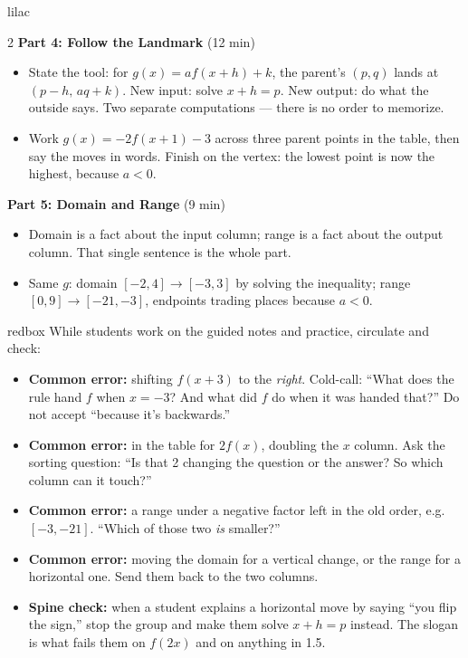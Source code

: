 \documentclass[10pt]{article}
\begin{document}
\begin{skillbox}[Lesson]{lilac}
\begin{multicols}{2}
\textbf{Part 4: Follow the Landmark} (12 min)

\begin{itemize}
  \item State the tool: for $g(x)=af(x+h)+k$, the parent's $(p,q)$ lands at
        $(p-h,\,aq+k)$. New input: solve $x+h=p$. New output: do what the
        outside says. Two separate computations --- there is no order to
        memorize.
  \item Work $g(x)=-2f(x+1)-3$ across three parent points in the table, then
        say the moves in words. Finish on the vertex: the lowest point is now
        the highest, because $a<0$.
\end{itemize}

\textbf{Part 5: Domain and Range} (9 min)

\begin{itemize}
  \item Domain is a fact about the input column; range is a fact about the
        output column. That single sentence is the whole part.
  \item Same $g$: domain $[-2,4] \to [-3,3]$ by solving the inequality; range
        $[0,9] \to [-21,-3]$, endpoints trading places because $a<0$.
\end{itemize}
\end{multicols}
\end{skillbox}

\begin{skillbox}{redbox}
While students work on the guided notes and practice, circulate and check:
\begin{itemize}
  \item \textbf{Common error:} shifting $f(x+3)$ to the \textit{right}.
        Cold-call: ``What does the rule hand $f$ when $x=-3$? And what did $f$
        do when it was handed that?'' Do not accept ``because it's
        backwards.''
  \item \textbf{Common error:} in the table for $2f(x)$, doubling the $x$
        column. Ask the sorting question: ``Is that 2 changing the question or
        the answer? So which column can it touch?''
  \item \textbf{Common error:} a range under a negative factor left in the old
        order, e.g.\ $[-3,-21]$. ``Which of those two \textit{is} smaller?''
  \item \textbf{Common error:} moving the domain for a vertical change, or the
        range for a horizontal one. Send them back to the two columns.
  \item \textbf{Spine check:} when a student explains a horizontal move by
        saying ``you flip the sign,'' stop the group and make them solve
        $x+h=p$ instead. The slogan is what fails them on $f(2x)$ and on
        anything in 1.5.
\end{itemize}
\end{skillbox}
\end{document}
